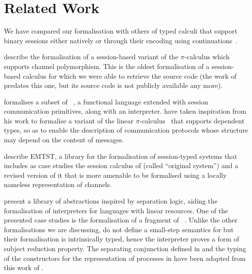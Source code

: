 \section{Related Work}
\label{sec:related}

We have compared our formalisation with others of typed calculi that support
binary sessions either natively or through their encoding using
continuations~\cite{KobayashiPierceTurner99,Kobayashi02b}.

\citet{GotoEtAl16} describe the formalisation of a session-based variant of the
$\pi$-calculus which supports channel polymorphism. This is the oldest
formalisation of a session-based calculus for which we were able to retrieve the
source code (the work of \citet{Gay01} predates this one, but its source code is
not publicly available any more).

\citet{Thiemann19} formalises a subset of \GV~\citep{GayVasconcelos10}, a
functional language extended with session communication primitives, along with
an interpreter. \citet{CicconePadovani20} have taken inspiration from his work
to formalise a variant of the linear
$\pi$-calculus~\cite{KobayashiPierceTurner99} that supports dependent types, so
as to enable the description of communication protocols whose structure may
depend on the content of messages.

\citet{CastroFerreiraYoshida20} describe EMTST, a library for the formalisation
of session-typed systems that includes as case studies the session calculus of
\citet{HondaVasconcelosKubo98} (called ``original system'') and a revised
version of it that is more amenable to be formalised using a locally nameless
representation of channels.

\citet{RouvoetPoulsenKrebbersVisser20} present a library of abstractions
inspired by separation logic, aiding the formalisation of interpreters for
languages with linear resources. One of the presented case studies is the
formalisation of a fragment of \GV~\citep{GayVasconcelos10,Wadler14}. 
%
Unlike the other formalisations we are discussing,
\citet{RouvoetPoulsenKrebbersVisser20} do not define a small-step semantics for
\GV but their formalisation is intrinsically typed, hence the interpreter
proves a form of subject reduction property.
%
The separating conjunction defined in  and the typing of
the constructors for the representation of processes in 
have been adapted from this work of \citet{RouvoetPoulsenKrebbersVisser20}.


